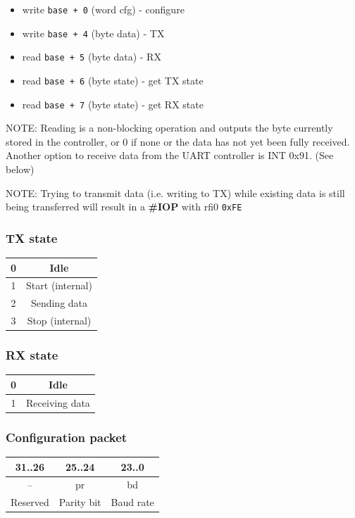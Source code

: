 \documentclass[a4paper,10pt]{article}
\begin{document}
\begin{itemize}
	\item write \verb|base + 0| (word cfg) - configure
	\item write \verb|base + 4| (byte data) - TX
	\item read \verb|base + 5| (byte data) - RX
	\item read \verb|base + 6| (byte state) - get TX state
	\item read \verb|base + 7| (byte state) - get RX state
\end{itemize}

NOTE: Reading is a non-blocking operation and outputs the byte currently stored in the controller, or 0 if none or the data has not yet been fully received. Another option to receive data from the UART controller is INT 0x91. (See below)

NOTE: Trying to transmit data (i.e. writing to TX) while existing data is still being transferred will result in a \textbf{\#IOP} with rfi0 \verb|0xFE|

\subsubsection{TX state}
\begin{table}[H]
	\centering
	{
		\begin{tabular}{|c|c|}
\hline
0 & Idle \\
\hline
1 & Start (internal) \\
\hline
2 & Sending data \\
\hline
3 & Stop (internal) \\
\hline
		\end{tabular}
	}
\end{table}

\subsubsection{RX state}
\begin{table}[H]
	\centering
	{
		\begin{tabular}{|c|c|}
\hline
0 & Idle \\
\hline
1 & Receiving data \\
\hline
		\end{tabular}
	}
\end{table}

\subsubsection{Configuration packet}
\begin{table}[H]
	\centering
	{
		\begin{tabular}{|c|c|c|}
\hline
31..26 & 25..24 & 23..0 \\
\hline
-- & pr & bd \\
\hline
Reserved & Parity bit & Baud rate \\
\hline
		\end{tabular}
	}
\end{table}
\end{document}
